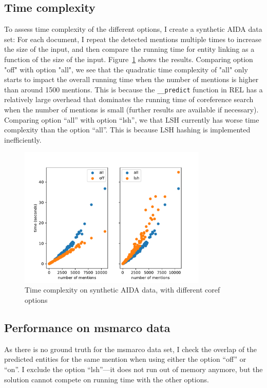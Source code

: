 \documentclass[a4paper,11pt]{article}
\numberwithin{equation}{section} %
\begin{document}
\subsection{Time complexity}
To assess time complexity of the different options, I create a synthetic AIDA data set: For each document, I repeat the detected mentions multiple times to increase the size of the input, and then compare the running time for entity linking as a function of the size of the input. Figure~\ref{fig:timing_aida_scale} shows the results.
Comparing option "off" with option "all", we see that the quadratic time complexity of "all" only starts to impact the overall running time when the number of mentions is higher than around 1500 mentions. This is because the \verb|__predict| function in REL has a relatively large overhead that dominates the running time of coreference search when the number of mentions is small (further results are available if necessary).
Comparing option ``all'' with option ``lsh'', we that LSH currently has worse time complexity than the option ``all''. This is because LSH hashing is implemented inefficiently.

\begin{figure}[H]
  \centering
  \includegraphics[width = 0.8\textwidth]{../figs/timing_aida_scale.pdf}
  \caption{Time complexity on synthetic AIDA data, with different coref options}
  \label{fig:timing_aida_scale}
\end{figure}

\subsection{Performance on msmarco data}

As there is no ground truth for the msmarco data set, I check the overlap of the predicted entities for the same mention when using either the option ``off'' or ``on''. I exclude the option ``lsh''---it does not run out of memory anymore, but the solution cannot compete on running time with the other options. 
\end{document}
